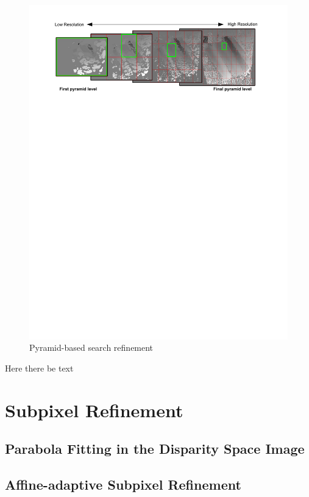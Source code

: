 \begin{figure}[h]
\begin{center}
  \includegraphics[trim = 0in 8.5in 0in 0in, width=7in]{images/stereo/pyramid_graphic.pdf}
\end{center}
  \caption{Pyramid-based search refinement}
  \label{fig:pyramid_search}
\end{figure}

Here there be text

\section{Subpixel Refinement}
\label{sec:subpixel_refinement}

\subsection{Parabola Fitting in the Disparity Space Image}

\subsection{Affine-adaptive Subpixel Refinement}

